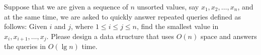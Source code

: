 \begin{Exercise}
Suppose that we are given a sequence of $n$ unsorted values, say $x_1, x_2, \dots, x_n$, and at the same time, we are asked to quickly answer repeated queries defined as follows: Given $i$ and $j$, where $1 \leq i \leq j \leq n$, find the smallest value in $x_i, x_{i+1}, \dots, x_j$. Please design a data structure that uses $O(n)$ space and answers the queries in $O(\lg n)$ time. 
\end{Exercise}
\begin{Answer}
\end{Answer}


\printbibliography[heading=subbibliography]
